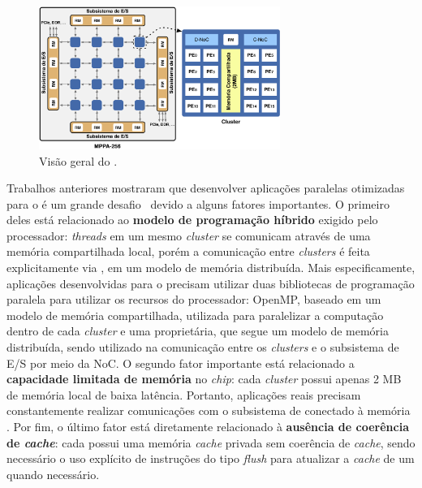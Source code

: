 \begin{figure}[t]
	\centering
	\includegraphics[width=0.7\textwidth]{figs/mppa-overall.pdf}
	\caption{Visão geral do \mppa.}
	\label{fig:mppa}
\end{figure}


Trabalhos anteriores mostraram que desenvolver aplicações paralelas otimizadas para o \mppa é um grande desafio~\cite{Castro-IA3-JPDC:2014} devido a alguns fatores importantes. O primeiro deles está relacionado ao \textbf{modelo de programação híbrido} exigido pelo processador: \textit{threads} em um mesmo \textit{cluster} se comunicam através de uma memória compartilhada local, porém a comunicação entre \textit{clusters} é feita explicitamente via \noc, em um modelo de memória distribuída. Mais especificamente, aplicações desenvolvidas para o \mppa precisam utilizar duas bibliotecas de programação paralela para utilizar os recursos do processador: OpenMP, baseado em um modelo de memória compartilhada, utilizada para paralelizar a computação dentro de cada \textit{cluster} e uma \api proprietária, que segue um modelo de memória distribuída, sendo utilizado na comunicação entre os \textit{clusters} e o subsistema de E/S por meio da NoC. O segundo fator importante está relacionado a \textbf{capacidade limitada de memória} no \textit{chip}: cada \textit{cluster} possui apenas 2 MB de memória local de baixa latência. Portanto, aplicações reais precisam constantemente realizar comunicações com o subsistema de \io conectado à memória \lpddr. Por fim, o último fator está diretamente relacionado à \textbf{ausência de coerência de \textit{cache}}: cada \pe possui uma memória \textit{cache} privada sem coerência de \textit{cache}, sendo necessário o uso explícito de instruções do tipo \textit{flush} para atualizar a \textit{cache} de um \pe quando necessário.

